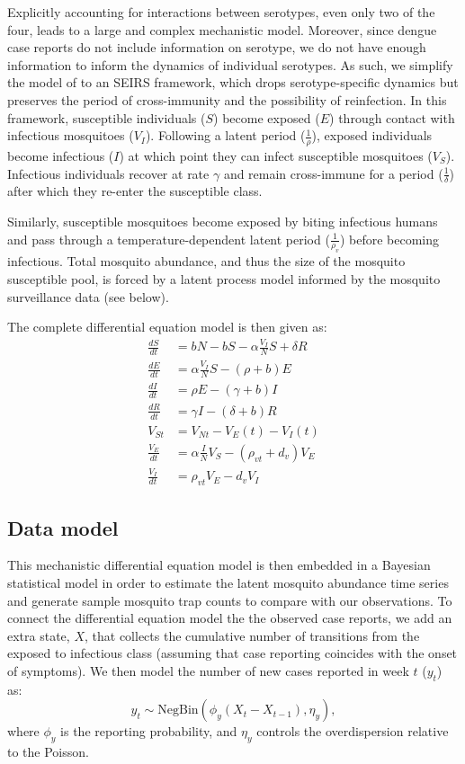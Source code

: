 \documentclass[10pt,letterpaper]{article}
\begin{document}
Explicitly accounting for interactions between serotypes, even only two of the four, leads to a large and complex mechanistic model.
Moreover, since dengue case reports do not include information on serotype, we do not have enough information to inform the dynamics of individual serotypes.
As such, we simplify the model of \cite{Wearing2006} to an SEIRS framework, which drops serotype-specific dynamics but preserves the period of cross-immunity and the possibility of reinfection.
In this framework, susceptible individuals ($S$) become exposed ($E$) through contact with infectious mosquitoes ($V_I$).
Following a latent period ($\frac{1}{\rho}$), exposed individuals become infectious ($I$) at which point they can infect susceptible mosquitoes ($V_S$).
Infectious individuals recover at rate $\gamma$ and remain cross-immune for a period ($\frac{1}{\delta}$) after which they re-enter the susceptible class.

Similarly, susceptible mosquitoes become exposed by biting infectious humans and pass through a temperature-dependent latent period ($\frac{1}{\rho_{v}}$) before becoming infectious.
Total mosquito abundance, and thus the size of the mosquito susceptible pool, is forced by a latent process model informed by the mosquito surveillance data (see below).

The complete differential equation model is then given as:
\begin{align} 
\frac{dS}{dt} &= bN - bS - \alpha \frac{V_{I}}{N} S + \delta R\\
\frac{dE}{dt} &= \alpha \frac{V_{I}}{N} S - (\rho + b)E\\
\frac{dI}{dt} &= \rho E - (\gamma + b)I\\
\frac{dR}{dt} &= \gamma I - (\delta + b)R\\
V_{St} & = V_{Nt} - V_E(t) - V_I(t)\\
\frac{V_E}{dt} &= \alpha \frac{I}{N} V_S - (\rho_{vt} + d_v)V_E\\
\frac{V_I}{dt} &= \rho_{vt} V_E - d_v V_I
\end{align}


\subsection*{Data model}

This mechanistic differential equation model is then embedded in a Bayesian statistical model in order to estimate the latent mosquito abundance time series and generate sample mosquito trap counts to compare with our observations.
To connect the differential equation model the the observed case reports, we add an extra state, $X$, that collects the cumulative number of transitions from the exposed to infectious class (assuming that case reporting coincides with the onset of symptoms).
We then model the number of new cases reported in week $t$ ($y_t$) as:
\begin{equation}
y_t  \sim \text{NegBin}(\phi_y (X_t - X_{t-1}), \eta_y),
\end{equation}
where $\phi_y$ is the reporting probability, and $\eta_y$ controls the overdispersion relative to the Poisson.
\end{document}
